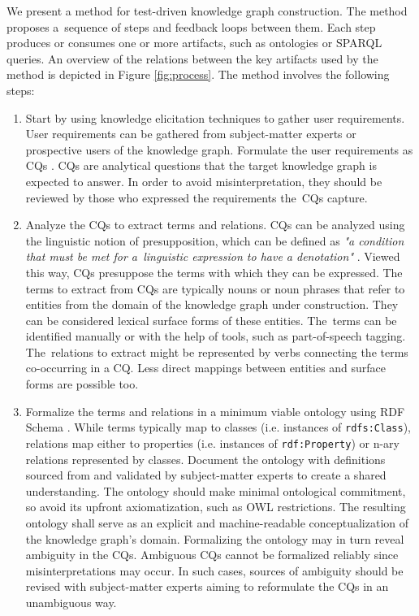 \documentclass[
]{ceurart}
\begin{document}
We present a method for test-driven knowledge graph construction. The method proposes a~sequence of steps and feedback loops between them. Each step produces or consumes one or more artifacts, such as ontologies or SPARQL queries. An overview of the relations between the key artifacts used by the method is depicted in Figure \ref{fig:process}. The method involves the following steps:
\begin{enumerate}
    \item Start by using knowledge elicitation techniques \cite{Shadbolt2015} to gather user requirements. User requirements can be gathered from subject-matter experts or prospective users of the knowledge graph. Formulate the user requirements as CQs \cite{Gruninger1994}. CQs are analytical questions that the target knowledge graph is expected to answer. In order to avoid misinterpretation, they should be reviewed by those who expressed the requirements the~CQs capture.
    \item Analyze the CQs to extract terms and relations. CQs can be analyzed using the linguistic notion of presupposition, which can be defined as \textit{"a condition that must be met for a~linguistic expression to have a denotation"} \cite{Ren2014}. Viewed this way, CQs presuppose the terms with which they can be expressed. The terms to extract from CQs are typically nouns or noun phrases that refer to entities from the domain of the knowledge graph under construction. They can be considered lexical surface forms of these entities. The~terms can be identified manually or with the help of tools, such as part-of-speech tagging. The~relations to extract might be represented by verbs connecting the terms co-occurring in a CQ. Less direct mappings between entities and surface forms are possible too.
    \item Formalize the terms and relations in a minimum viable ontology using RDF Schema \cite{Brickley2014}. While terms typically map to classes (i.e. instances of \texttt{rdfs:Class}), relations map either to properties (i.e. instances of \texttt{rdf:Property}) or n-ary relations represented by classes. Document the ontology with definitions sourced from and validated by subject-matter experts to create a shared understanding. The ontology should make minimal ontological commitment, so avoid its upfront axiomatization, such as OWL restrictions. The resulting ontology shall serve as an explicit and machine-readable conceptualization of the knowledge graph's domain. Formalizing the ontology may in turn reveal ambiguity in the CQs. Ambiguous CQs cannot be formalized reliably since misinterpretations may occur. In such cases, sources of ambiguity should be revised with subject-matter experts aiming to reformulate the CQs in an unambiguous way.

\end{enumerate}
\end{document}
